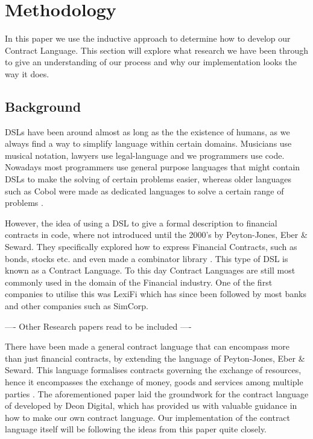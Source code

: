 \documentclass{ituthesis}
\begin{document}
\chapter{Methodology}


In this paper we use the inductive approach to determine how to develop our Contract Language. This section will explore what research we have been through to give an understanding of our process and why our implementation looks the way it does.

\section{Background}
DSLs have been around almost as long as the the existence of humans, as we always find a way to simplify language within certain domains. Musicians use musical notation, lawyers use legal-language and we programmers use code. Nowadays most programmers use general purpose languages that might contain DSLs to make the solving of certain problems easier, whereas older languages such as Cobol were made as dedicated languages to solve a certain range of problems \cite{van2000domain}.

However, the idea of using a DSL to give a formal description to financial contracts in code, where not introduced until the 2000's by Peyton-Jones, Eber \& Seward. They specifically explored how to express Financial Contracts, such as bonds, stocks etc. and even made a combinator library \cite{peyton2000composing}. This type of DSL is known as a Contract Language. To this day Contract Languages are still most commonly used in the domain of the Financial industry. One of the first companies to utilise this was LexiFi which has since been followed by most banks and other companies such as SimCorp.

---- Other Research papers read to be included ----

There have been made a general contract language that can encompass more than just financial contracts, by extending the language of Peyton-Jones, Eber \& Seward. This language formalises contracts governing the exchange of resources, hence it encompasses the exchange of money, goods and services among multiple parties \cite{andersen2006compositional}. The aforementioned paper laid the groundwork for the contract language of developed by Deon Digital, which has provided us with valuable guidance in how to make our own contract language. Our implementation of the contract language itself will be following the ideas from this paper quite closely.
\end{document}
